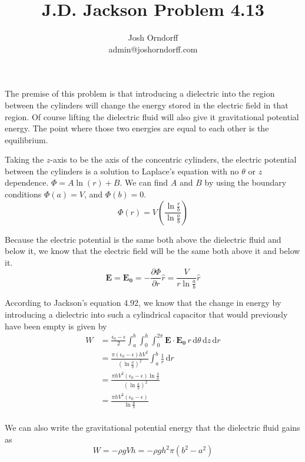 \documentclass[10pt,a4paper]{article}
\begin{document}
\title{J.D. Jackson Problem 4.13}
\author{Josh Orndorff \\ admin@joshorndorff.com}
\maketitle

The premise of this problem is that introducing a dielectric into the region between the cylinders will change the energy stored in the electric field in that region.  Of course lifting the dielectric fluid will also give it gravitational potential energy.  The point where those two energies are equal to each other is the equilibrium.

Taking the $z$-axis to be the axis of the concentric cylinders, the electric potential between the cylinders is a solution to Laplace's equation with no $\theta$ or $z$ dependence.  $\Phi=A \ln(r) +B$.  We can find $A$ and $B$ by using the boundary conditions $\Phi(a)=V$, and $\Phi(b)=0$.
\begin{equation}
\Phi(r)=V\left(\frac{\ln\frac{r}{b}}{\ln\frac{a}{b}}\right)
\end{equation}

Because the electric potential is the same both above the dielectric fluid and below it, we know that the electric field will be the same both above it and below it.
\begin{equation}
\mathbf{E}=\mathbf{E_0}=-\frac{\partial \Phi}{\partial r} \hat{r}=\frac{V}{r\ln\frac{a}{b}}\hat{r}
\end{equation}

According to Jackson's equation 4.92, we know that the change in energy by introducing a dielectric into such a cylindrical capacitor that would previously have been empty is given by
\begin{align}
W&=\frac{\epsilon_0-\epsilon}{2}\int_a^b \int_0^h \int_0^{2\pi} \mathbf{E}\cdot \mathbf{E_0}\, r \,\mathrm{d}\theta \,\mathrm{d}z \,\mathrm{d}r \\
&=\frac{\pi(\epsilon_0-\epsilon)hV^2}{\left(\ln\frac{a}{b}\right)^2}\int_a^b \frac{1}{r}\,\mathrm{d}r \\
&=\frac{\pi hV^2(\epsilon_0-\epsilon)\ln\frac{b}{a}}{\left(\ln\frac{a}{b}\right)^2} \\
&=\frac{\pi hV^2(\epsilon_0-\epsilon)}{\ln\frac{a}{b}} \\
\end{align}

We can also write the gravitational potential energy that the dielectric fluid gains as
\begin{equation}
W=-\rho gVh =-\rho gh^2\pi(b^2-a^2)
\end{equation}
\end{document}

